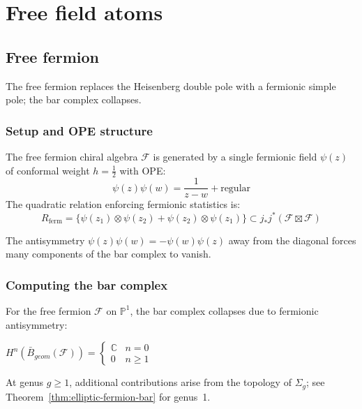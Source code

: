 
\chapter{Free field atoms}\label{chap:free-fields}


\section{Free fermion}\label{sec:free-fermion}%
%

The free fermion replaces the Heisenberg double pole with a fermionic simple pole; the bar complex collapses.
 
\subsection{Setup and OPE structure}
 
\begin{definition}
The free fermion chiral algebra $\mathcal{F}$ is generated by a single fermionic field $\psi(z)$ of 
conformal weight $h = \frac{1}{2}$ with OPE:
\[
\psi(z)\psi(w) = \frac{1}{z-w} + \text{regular}
\]
The quadratic relation enforcing fermionic statistics is:
\[
R_{\text{ferm}} = \{\psi(z_1) \otimes \psi(z_2) + \psi(z_2) \otimes \psi(z_1)\} \subset 
j_*j^*(\mathcal{F} \boxtimes \mathcal{F})
\]
\end{definition}

\begin{remark}
The antisymmetry $\psi(z)\psi(w) = -\psi(w)\psi(z)$ away from the diagonal forces many components of the bar complex to vanish.
\end{remark}
 
\subsection{Computing the bar complex}

\begin{theorem}
\label{thm:fermion-bar-complex-genus-0}
For the free fermion $\mathcal{F}$ on $\mathbb{P}^1$, the bar complex collapses due to fermionic antisymmetry:

$H^n(\bar{B}_{geom}(\mathcal{F})) = \begin{cases}
\mathbb{C} & n = 0\\
0 & n \geq 1
\end{cases}$

At genus $g \geq 1$, additional contributions arise from the topology of $\Sigma_g$; see Theorem~\ref{thm:elliptic-fermion-bar} for genus~1.
\end{theorem}

